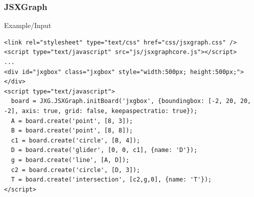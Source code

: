\documentclass{beamer}
\begin{document}

\begin{frame}[fragile]
  \frametitle{JSXGraph}
  \begin{block}{Example/Input}
    \begin{lstlisting}
<link rel="stylesheet" type="text/css" href="css/jsxgraph.css" />
<script type="text/javascript" src="js/jsxgraphcore.js"></script>
...
<div id="jxgbox" class="jxgbox" style="width:500px; height:500px;"></div>
<script type="text/javascript">
  board = JXG.JSXGraph.initBoard('jxgbox', {boundingbox: [-2, 20, 20, -2], axis: true, grid: false, keepaspectratio: true});
  A = board.create('point', [8, 3]);
  B = board.create('point', [8, 8]);
  c1 = board.create('circle', [B, 4]);
  D = board.create('glider', [0, 0, c1], {name: 'D'});
  g = board.create('line', [A, D]);
  c2 = board.create('circle', [D, 3]);
  T = board.create('intersection', [c2,g,0], {name: 'T'});
</script>
    \end{lstlisting}
  \end{block}
\end{frame}
\end{document}
